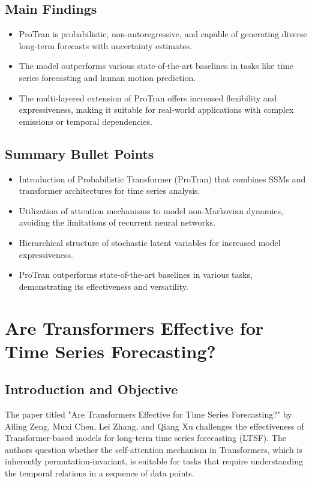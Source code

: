 \documentclass{article}
\begin{document}
\subsection{Main Findings}
\begin{itemize}
    \item ProTran is probabilistic, non-autoregressive, and capable of generating diverse long-term forecasts with uncertainty estimates.
    \item The model outperforms various state-of-the-art baselines in tasks like time series forecasting and human motion prediction.
    \item The multi-layered extension of ProTran offers increased flexibility and expressiveness, making it suitable for real-world applications with complex emissions or temporal dependencies.
\end{itemize}

\subsection{Summary Bullet Points}
\begin{itemize}
    \item Introduction of Probabilistic Transformer (ProTran) that combines SSMs and transformer architectures for time series analysis.
    \item Utilization of attention mechanisms to model non-Markovian dynamics, avoiding the limitations of recurrent neural networks.
    \item Hierarchical structure of stochastic latent variables for increased model expressiveness.
    \item ProTran outperforms state-of-the-art baselines in various tasks, demonstrating its effectiveness and versatility.
\end{itemize}

\newpage
\section{Are Transformers Effective for Time Series Forecasting?}

\subsection{Introduction and Objective}
The paper titled "Are Transformers Effective for Time Series Forecasting?" by Ailing Zeng, Muxi Chen, Lei Zhang, and Qiang Xu challenges the effectiveness of Transformer-based models for long-term time series forecasting (LTSF). The authors question whether the self-attention mechanism in Transformers, which is inherently permutation-invariant, is suitable for tasks that require understanding the temporal relations in a sequence of data points.
\end{document}
